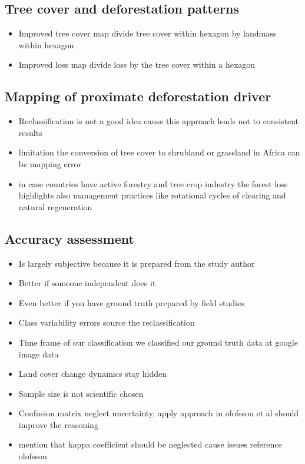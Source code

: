 		\subsection{Tree cover and deforestation patterns}
		\label{subsec:discussion_tree_cover_and_deforestation}
			\begin{itemize}
				\item Improved tree cover map divide tree cover within hexagon by landmass within hexagon
				\item Improved loss map divide loss by the tree cover within a hexagon
			\end{itemize}

		\subsection{Mapping of proximate deforestation driver}
		\label{subsec:discussion_proxy_deforestation_driver}
			\begin{itemize}
				\item Reclassification is not a good idea cause this approach leads not to consistent results
				\item limitation the conversion of tree cover to shrubland or grassland in Africa can be mapping error
				\item in case countries have active forestry and tree crop industry the forest loss highlights also management practices like rotational cycles of clearing and natural regeneration  
			\end{itemize}

		\subsection{Accuracy assessment}
		\label{subsec:discussion_accuracy_assessment}
			\begin{itemize}
				\item Is largely subjective because it is prepared from the study author
				\item Better if someone independent does it 
				\item Even better if you have ground truth prepared by field studies
				\item Class variability errors source the reclassification
				\item Time frame of our classification we classified our ground truth data at google image data
				\item Land cover change dynamics stay hidden
				\item Sample size is not scientific chosen
				\item Confusion matrix neglect uncertainty, apply approach in olofsson et al should improve the reasoning
				\item mention that kappa coefficient should be neglected cause issues reference olofsson 
			\end{itemize}

